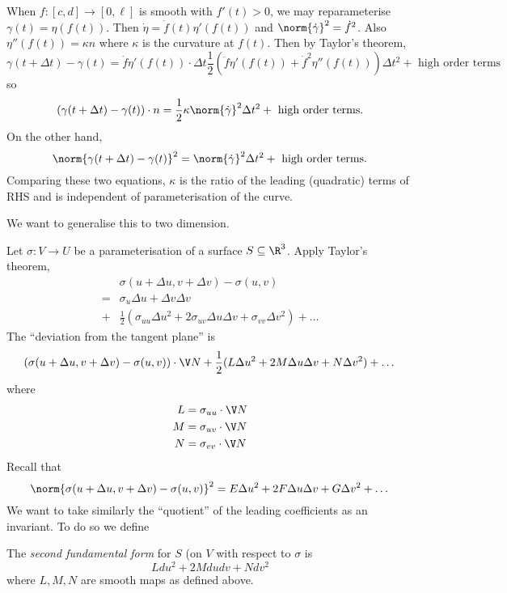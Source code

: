 \documentclass[a4paper]{article}
\theoremstyle{definition}
\begin{document}
When \(f: [c, d] \to [0, \ell]\) is smooth with \(f'(t) > 0\), we may reparameterise \(\gamma(t) = \eta(f(t))\). Then \(\dot \eta = \dot f(t)\eta'(f(t))\) and \(\norm{\dot \gamma}^2 = \dot f^2\). Also \(\eta''(f(t)) = \kappa n\) where \(\kappa\) is the curvature at \(f(t)\). Then by Taylor's theorem,
\[
  \gamma(t + \Delta t) - \gamma(t) = \dot f \eta'(f(t)) \cdot \Delta t \frac{1}{2} (\ddot f \eta'(f(t)) + \dot f^2 \eta''(f(t))) \Delta t^2 + \text{ high order terms}
\]
so
\[
  (\gamma(t + \Delta t) - \gamma(t)) \cdot n = \frac{1}{2} \kappa \norm{\dot \gamma}^2 \Delta t^2 + \text{ high order terms}.
\]
On the other hand,
\[
  \norm{\gamma(t + \Delta t) - \gamma(t)}^2 = \norm{\dot \gamma}^2 \Delta t^2 + \text{ high order terms}.
\]
Comparing these two equations, \(\kappa\) is the ratio of the leading (quadratic) terms of RHS and is independent of parameterisation of the curve.

We want to generalise this to two dimension.

Let \(\sigma: V \to U\) be a parameterisation of a surface \(S \subseteq \R^3\). Apply Taylor's theorem,
\begin{align*}
  &\sigma(u + \Delta u, v + \Delta v) - \sigma(u, v) \\
  =& \sigma_u \Delta u + \Delta v \Delta v \\
  +& \frac{1}{2} (\sigma_{uu} \Delta u^2 + 2 \sigma_{uv} \Delta u \Delta v + \sigma_{vv} \Delta v^2) + \dots
\end{align*}
The ``deviation from the tangent plane'' is
\[
  (\sigma(u + \Delta u, v + \Delta v) - \sigma(u, v)) \cdot \V N + \frac{1}{2} (L \Delta u^2 + 2M \Delta u \Delta v + N \Delta v^2) + \dots
\]
where
\begin{align*}
  L &= \sigma_{uu} \cdot \V N \\
  M &= \sigma_{uv} \cdot \V N \\
  N &= \sigma_{vv} \cdot \V N
\end{align*}
Recall that
\[
  \norm{\sigma(u + \Delta u, v + \Delta v) - \sigma(u, v)}^2 = E \Delta u^2 + 2F \Delta u \Delta v + G \Delta v^2 + \dots
\]
We want to take similarly the ``quotient'' of the leading coefficients as an invariant. To do so we define

\begin{definition}
  The \emph{second fundamental form} for \(S\) (on \(V\) with respect to \(\sigma\) is
  \[
    L du^2 + 2M dudv + N dv^2
  \]
  where \(L, M, N\) are smooth maps as defined above.
\end{definition}
\end{document}
